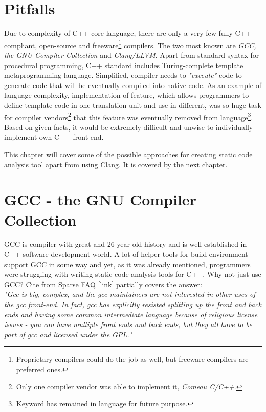 \section{Pitfalls}
Due to complexity of C++ core language, there are only a very few fully C++ compliant, open-source and freeware\footnote{Proprietary compilers could do the job as well, but freeware compilers are preferred ones.} compilers. The two most known are \emph{GCC, the GNU Compiler Collection} and \emph{Clang/LLVM}. Apart from standard syntax for procedural programming, C++ standard includes Turing-complete template metaprogramming language. Simplified, compiler needs to \textit{"execute"} code to generate code that will be eventually compiled into native code. As an example of language complexity, implementation of  feature, which allows programmers to define template code in one translation unit and use in different, was so huge task for compiler vendors\footnote{Only one compiler vendor was able to implement it, \emph{Comeau C/C++}.} that this feature was eventually removed from language\footnote{Keyword has remained in language for future purpose.}. Based on given facts, it would be extremely difficult and unwise to individually implement own C++ front-end.

This chapter will cover some of the possible approaches for creating static code analysis tool apart from using Clang. It is covered by the next chapter.

\section{GCC - the GNU Compiler Collection}
GCC is compiler with great and 26 year old history and is well established in C++ software development world. A lot of helper tools for build environment support GCC in some way and yet, as it was already mentioned, programmers were struggling with writing static code analysis tools for C++. Why not just use GCC? Cite from Sparse FAQ [link] partially covers the answer:\\

\emph{"Gcc is big, complex, and the gcc maintainers are not interested in other uses of the gcc front-end.  In fact, gcc has explicitly resisted splitting up the front and back ends and having some common intermediate language because of religious license issues - you can have multiple front ends and back ends, but they all have to be part of gcc and licensed under the GPL."}\\

